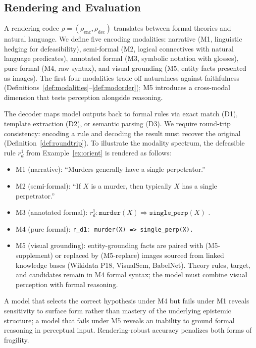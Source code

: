 \documentclass{article}
\theoremstyle{definition}
\newcommand{\defto}{\Rightarrow}
\begin{document}
\subsection{Rendering and Evaluation}\label{subsec:rendering}

A rendering codec $\rho = (\rho_{\mathrm{enc}}, \rho_{\mathrm{dec}})$ translates between formal theories and natural language. We define five encoding modalities: narrative (M1, linguistic hedging for defeasibility), semi-formal (M2, logical connectives with natural language predicates), annotated formal (M3, symbolic notation with glosses), pure formal (M4, raw syntax), and visual grounding (M5, entity facts presented as images). The first four modalities trade off naturalness against faithfulness (Definitions~\ref{def:modalities}--\ref{def:modorder}); M5 introduces a cross-modal dimension that tests perception alongside reasoning.

The decoder maps model outputs back to formal rules via exact match (D1), template extraction (D2), or semantic parsing (D3). We require round-trip consistency: encoding a rule and decoding the result must recover the original (Definition~\ref{def:roundtrip}). To illustrate the modality spectrum, the defeasible rule $r_d^1$ from Example~\ref{ex:orient} is rendered as follows:
\begin{itemize}[nosep]
\item M1 (narrative): ``Murders generally have a single perpetrator.''
\item M2 (semi-formal): ``If $X$ is a murder, then typically $X$ has a single perpetrator.''
\item M3 (annotated formal): $r_d^1\colon \texttt{murder}(X) \defto \texttt{single\_perp}(X)$ .
\item M4 (pure formal): \texttt{r\_d1: murder(X) => single\_perp(X).}
\item M5 (visual grounding): entity-grounding facts are paired with (M5-supplement) or replaced by (M5-replace) images sourced from linked knowledge bases (Wikidata P18, VisualSem, BabelNet). Theory rules, target, and candidates remain in M4 formal syntax; the model must combine visual perception with formal reasoning.
\end{itemize}
A model that selects the correct hypothesis under M4 but fails under M1 reveals sensitivity to surface form rather than mastery of the underlying epistemic structure; a model that fails under M5 reveals an inability to ground formal reasoning in perceptual input. Rendering-robust accuracy penalizes both forms of fragility.
\end{document}
